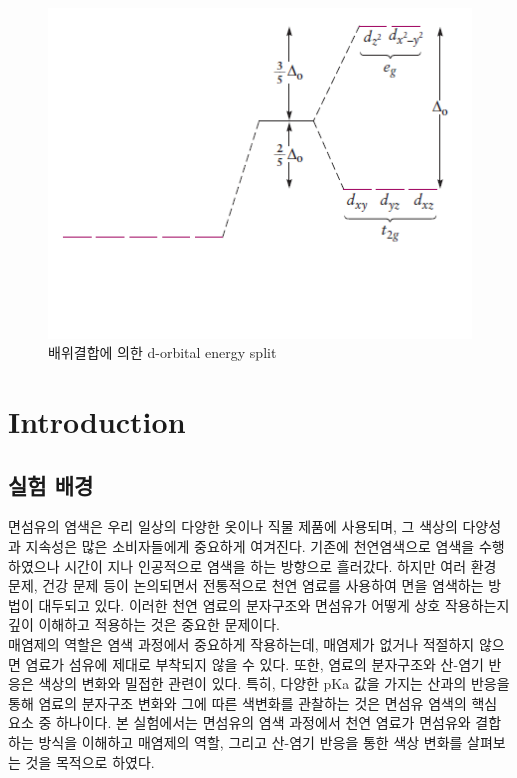 \documentclass[%
 reprint,
 amsmath,amssymb,
 aps,
]{revtex4-2}
\begin{document}
\begin{figure}[htbp]
	\includegraphics[width = 0.9\linewidth]{energy_splitting.png}%
	\caption{\label{fig:energy_splitting}배위결합에 의한 d-orbital energy split}
\end{figure}


\section{\label{sec:level1}Introduction}
\subsection{\label{sec:level2}실험 배경}
면섬유의 염색은 우리 일상의 다양한 옷이나 직물 제품에 사용되며, 그 색상의 다양성과 지속성은 많은 소비자들에게 중요하게 여겨진다. 기존에 천연염색으로 염색을 수행하였으나 시간이 지나 인공적으로 염색을 하는 방향으로 흘러갔다. 하지만 여러 환경 문제, 건강 문제 등이 논의되면서 전통적으로 천연 염료를 사용하여 면을 염색하는 방법이 대두되고 있다. 이러한 천연 염료의 분자구조와 면섬유가 어떻게 상호 작용하는지 깊이 이해하고 적용하는 것은 중요한 문제이다.\\

매염제의 역할은 염색 과정에서 중요하게 작용하는데, 매염제가 없거나 적절하지 않으면 염료가 섬유에 제대로 부착되지 않을 수 있다. 또한, 염료의 분자구조와 산-염기 반응은 색상의 변화와 밀접한 관련이 있다. 특히, 다양한 pKa 값을 가지는 산과의 반응을 통해 염료의 분자구조 변화와 그에 따른 색변화를 관찰하는 것은 면섬유 염색의 핵심 요소 중 하나이다. 본 실험에서는 면섬유의 염색 과정에서 천연 염료가 면섬유와 결합하는 방식을 이해하고 매염제의 역할, 그리고 산-염기 반응을 통한 색상 변화를 살펴보는 것을 목적으로 하였다.
\end{document}

